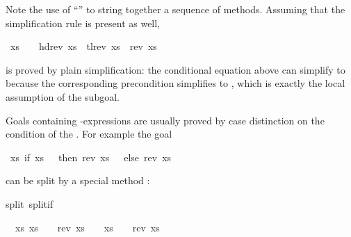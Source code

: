 \begin{isabellebody}
%
\begin{isamarkuptext}%
\noindent
Note the use of ``'' to string together a
sequence of methods. Assuming that the simplification rule
is present as well,%
\end{isamarkuptext}%
\ {\isachardoublequote}xs\ {\isasymnoteq}\ {\isacharbrackleft}{\isacharbrackright}\ {\isasymLongrightarrow}\ hd{\isacharparenleft}rev\ xs{\isacharparenright}\ {\isacharhash}\ tl{\isacharparenleft}rev\ xs{\isacharparenright}\ {\isacharequal}\ rev\ xs{\isachardoublequote}%
\begin{isamarkuptext}%
\noindent
is proved by plain simplification:
the conditional equation  above
can simplify  to 
because the corresponding precondition 
simplifies to , which is exactly the local
assumption of the subgoal.%
\end{isamarkuptext}%
%
%
\begin{isamarkuptext}%
Goals containing -expressions are usually proved by case
distinction on the condition of the . For example the goal%
\end{isamarkuptext}%
\ {\isachardoublequote}{\isasymforall}xs{\isachardot}\ if\ xs\ {\isacharequal}\ {\isacharbrackleft}{\isacharbrackright}\ then\ rev\ xs\ {\isacharequal}\ {\isacharbrackleft}{\isacharbrackright}\ else\ rev\ xs\ {\isasymnoteq}\ {\isacharbrackleft}{\isacharbrackright}{\isachardoublequote}%
\begin{isamarkuptxt}%
\noindent
can be split by a special method :%
\end{isamarkuptxt}%
split\ split{\isacharunderscore}if{\isacharparenright}%
\begin{isamarkuptxt}%
\noindent
\begin{isabelle}%
\ {}{\isachardot}\ {\isasymforall}xs{\isachardot}\ {\isacharparenleft}xs\ {\isacharequal}\ {\isacharbrackleft}{\isacharbrackright}\ {\isasymlongrightarrow}\ rev\ xs\ {\isacharequal}\ {\isacharbrackleft}{\isacharbrackright}{\isacharparenright}\ {\isasymand}\ {\isacharparenleft}xs\ {\isasymnoteq}\ {\isacharbrackleft}{\isacharbrackright}\ {\isasymlongrightarrow}\ rev\ xs\ {\isasymnoteq}\ {\isacharbrackleft}{\isacharbrackright}{\isacharparenright}%

\end{isabelle}
\end{isamarkuptxt}
\end{isabellebody}
